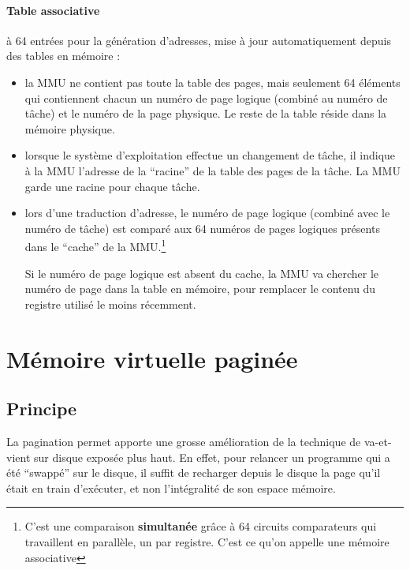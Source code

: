 \begin{multicols}{2}
\begin{itemize}
\paragraph{Table associative} à 64 entrées pour la 
génération d'adresses, mise à jour automatiquement depuis des tables
en mémoire : 
\begin{itemize}
\item la MMU ne contient pas toute la table des pages, mais seulement
  64 éléments qui contiennent chacun un numéro de page logique
  (combiné au numéro de tâche) et le numéro de la page physique. Le
  reste de la table réside dans la mémoire physique.
\item lorsque le système d'exploitation effectue un changement de tâche,
il indique à la MMU l'adresse de la ``racine'' de la table des pages de la tâche.
La MMU garde une racine pour chaque tâche.
\item lors d'une traduction d'adresse, le numéro de page logique
  (combiné avec le numéro de tâche) est comparé aux 64 numéros de
  pages logiques présents dans le ``cache'' de la MMU.\footnote{C'est
    une comparaison \textbf{simultanée} grâce à 64 circuits
    comparateurs qui travaillent en parallèle, un par registre. C'est
    ce qu'on appelle une mémoire associative}

Si le numéro de page logique est absent du cache, la MMU va
  chercher le numéro de page dans la table en mémoire, pour remplacer
  le contenu du registre utilisé le moins récemment.

\end{itemize}
\end{itemize}




\section{Mémoire virtuelle paginée}

\subsection{Principe}

La pagination permet apporte une grosse amélioration de la technique
de va-et-vient sur disque exposée plus haut.  En effet, pour relancer
un programme qui a été ``swappé'' sur le disque, il suffit de
recharger depuis le disque la page qu'il était en train d'exécuter, et
non l'intégralité de son espace mémoire.




\end{multicols}
